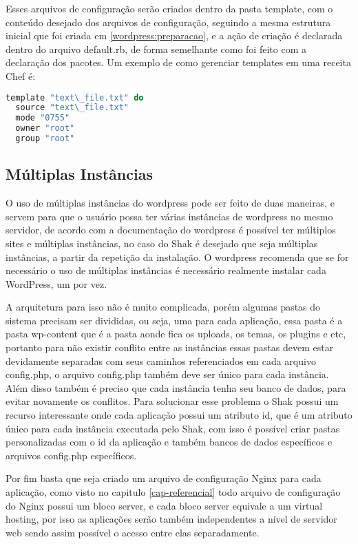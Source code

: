 Esses arquivos de configuração serão criados dentro da pasta template, com o conteúdo
desejado dos arquivos de configuração, seguindo a mesma estrutura
inicial que foi criada em \ref{wordpress:preparacao}, e a ação de criação é
declarada dentro do arquivo default.rb, de forma semelhante como foi feito com
a declaração dos pacotes. Um exemplo de como gerenciar templates em uma receita Chef
é:

\begin{lstlisting}[language=Ruby,label=dice_index,caption={Exemplo de criação de templates com o chef}]
  template "text\_file.txt" do
  source "text\_file.txt"
  mode "0755"
  owner "root"
  group "root"
\end{lstlisting}

\subsection{Múltiplas Instâncias}

O uso de múltiplas instâncias do wordpress pode ser feito de duas maneiras, e servem
para que o usuário possa ter várias instâncias de wordpress no mesmo servidor, de
acordo com a documentação do wordpress é possível ter múltiplos sites e múltiplas
instâncias, no caso do Shak é desejado que seja múltiplas instâncias, a partir da
repetição da instalação. O wordpress recomenda que se for necessário o uso de múltiplas
instâncias é necessário realmente instalar cada WordPress, um por vez.

A arquitetura para isso não é muito complicada, porém algumas pastas do sistema
precisam ser divididas, ou seja, uma para cada aplicação, essa pasta é a pasta wp-content
que é a pasta aonde fica os uploads, os temas, os plugins e etc, portanto para não
existir conflito entre as instâncias essas pastas devem estar devidamente separadas
com seus caminhos referenciados em cada arquivo config.php, o arquivo config.php também
deve ser único para cada instância. Além disso também é preciso que cada instância
tenha seu banco de dados, para evitar novamente os conflitos. Para
solucionar esse problema o Shak possui um recurso interessante onde cada aplicação
possui um atributo id, que é um atributo único para cada instância executada pelo
Shak, com isso é possível criar pastas personalizadas com o id da aplicação e também
bancos de dados específicos e arquivos config.php específicos.

Por fim basta que seja criado um arquivo de configuração Nginx para cada aplicação,
como visto no capitulo \ref{cap-referencial} todo arquivo de configuração
do Nginx possui um bloco server, e cada bloco server equivale a um virtual hosting,
por isso as aplicações serão também independentes a nível de servidor web sendo assim
possível o acesso entre elas separadamente.

